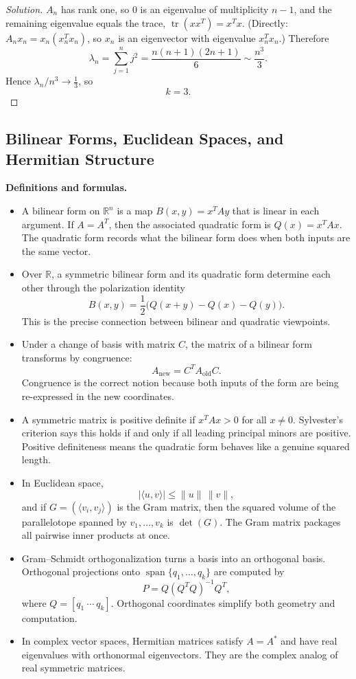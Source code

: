 \documentclass[11pt]{article}
\theoremstyle{definition}
\newcommand{\R}{\mathbb{R}}
\newcommand{\Span}{\operatorname{span}}
\begin{document}
\begin{proof}[Solution]
$A_n$ has rank one, so $0$ is an eigenvalue of multiplicity $n-1$, and the remaining eigenvalue equals the trace, $\operatorname{tr}(xx^T)=x^Tx$. (Directly: $A_nx_n=x_n(x_n^Tx_n)$, so $x_n$ is an eigenvector with eigenvalue $x_n^Tx_n$.) Therefore
\[
\lambda_n=\sum_{j=1}^nj^2=\frac{n(n+1)(2n+1)}6\sim\frac{n^3}3 .
\]
Hence $\lambda_n/n^3\to\tfrac13$, so
\[
\boxed{k=3}.
\]
\end{proof}

\subsection{Bilinear Forms, Euclidean Spaces, and Hermitian Structure}
\textbf{Definitions and formulas.}
\begin{itemize}
    \item A bilinear form on $\R^n$ is a map $B(x,y)=x^TAy$ that is linear in each argument. If $A=A^T$, then the associated quadratic form is $Q(x)=x^TAx$. The quadratic form records what the bilinear form does when both inputs are the same vector.
    \item Over $\R$, a symmetric bilinear form and its quadratic form determine each other through the polarization identity
    \[
        B(x,y)=\frac12\bigl(Q(x+y)-Q(x)-Q(y)\bigr).
    \]
    This is the precise connection between bilinear and quadratic viewpoints.
    \item Under a change of basis with matrix $C$, the matrix of a bilinear form transforms by congruence:
    \[
        A_{\text{new}} = C^T A_{\text{old}} C.
    \]
    Congruence is the correct notion because both inputs of the form are being re-expressed in the new coordinates.
    \item A symmetric matrix is positive definite if $x^TAx>0$ for all $x\neq 0$. Sylvester's criterion says this holds if and only if all leading principal minors are positive. Positive definiteness means the quadratic form behaves like a genuine squared length.
    \item In Euclidean space,
    \[
        |\langle u,v\rangle|\le \|u\|\,\|v\|,
    \]
    and if $G=(\langle v_i,v_j\rangle)$ is the Gram matrix, then the squared volume of the parallelotope spanned by $v_1,\dots,v_k$ is $\det(G)$. The Gram matrix packages all pairwise inner products at once.
    \item Gram--Schmidt orthogonalization turns a basis into an orthogonal basis. Orthogonal projections onto $\Span\{q_1,\dots,q_k\}$ are computed by
    \[
        P=Q(Q^TQ)^{-1}Q^T,
    \]
    where $Q=[q_1\ \cdots\ q_k]$. Orthogonal coordinates simplify both geometry and computation.
    \item In complex vector spaces, Hermitian matrices satisfy $A=A^*$ and have real eigenvalues with orthonormal eigenvectors. They are the complex analog of real symmetric matrices.
\end{itemize}
\end{document}
